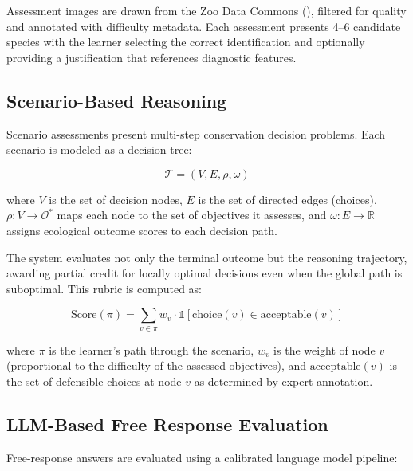 Assessment images are drawn from the Zoo Data Commons (), filtered for quality and annotated with difficulty metadata.
Each assessment presents 4--6 candidate species with the learner selecting the correct identification and optionally providing a justification that references diagnostic features.

\subsection{Scenario-Based Reasoning}

Scenario assessments present multi-step conservation decision problems.
Each scenario is modeled as a decision tree:

\begin{equation}
    \mathcal{T} = (V, E, \rho, \omega)
\end{equation}

\noindent where $V$ is the set of decision nodes, $E$ is the set of directed edges (choices), $\rho: V \rightarrow \mathcal{O}^*$ maps each node to the set of objectives it assesses, and $\omega: E \rightarrow \mathbb{R}$ assigns ecological outcome scores to each decision path.

The system evaluates not only the terminal outcome but the reasoning trajectory, awarding partial credit for locally optimal decisions even when the global path is suboptimal.
This rubric is computed as:

\begin{equation}
    \text{Score}(\pi) = \sum_{v \in \pi} w_v \cdot \mathbb{1}[\text{choice}(v) \in \text{acceptable}(v)]
\end{equation}

\noindent where $\pi$ is the learner's path through the scenario, $w_v$ is the weight of node $v$ (proportional to the difficulty of the assessed objectives), and $\text{acceptable}(v)$ is the set of defensible choices at node $v$ as determined by expert annotation.

\subsection{LLM-Based Free Response Evaluation}

Free-response answers are evaluated using a calibrated language model pipeline:


